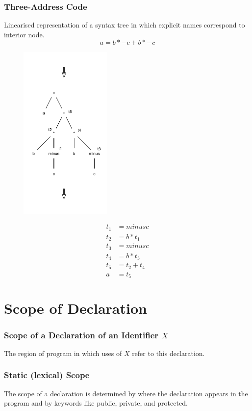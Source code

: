 \subsubsection{Three-Address Code}
Linearised representation of a syntax tree in which explicit names correspond to interior node.
$$
	a = b \ast -c + b \ast -c
$$
\begin{figure}[H]
	\centerline{\includegraphics[width=0.4\textwidth]{img/16.pdf}}
\end{figure}
\begin{align*}
	t_1 &= minus c \\
	t_2 &= b \ast t_1 \\
	t_3 &= minus c \\
	t_4 &= b \ast t_3 \\
	t_5 &= t_2 + t_4 \\
	a &= t_5
\end{align*}

\section{Scope of Declaration}
\subsubsection{Scope of a Declaration of an Identifier $X$}
The region of program in which uses of $X$ refer to this declaration.
\subsubsection{Static (lexical) Scope}
The scope of a declaration is determined by where the declaration appears in the program and by keywords like public, private, and protected.
